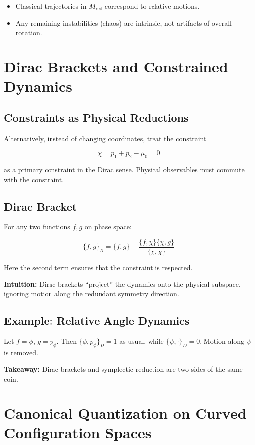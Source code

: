 \documentclass[11pt]{book}
\begin{document}
\begin{itemize}
    \item Classical trajectories in $M_{\text{red}}$ correspond to relative motions.
    \item Any remaining instabilities (chaos) are intrinsic, not artifacts of overall rotation.
\end{itemize}


\chapter{Dirac Brackets and Constrained Dynamics}

\section{Constraints as Physical Reductions}

Alternatively, instead of changing coordinates, treat the constraint

\[
\chi = p_1+p_2-\mu_0=0
\]

as a primary constraint in the Dirac sense. Physical observables must commute with the constraint.

\section{Dirac Bracket}

For any two functions $f,g$ on phase space:

\[
\{f,g\}_D = \{f,g\} - \frac{\{f,\chi\}\{\chi,g\}}{\{\chi,\chi\}}
\]

Here the second term ensures that the constraint is respected.  

\textbf{Intuition:} Dirac brackets “project” the dynamics onto the physical subspace, ignoring motion along the redundant symmetry direction.

\section{Example: Relative Angle Dynamics}

Let $f=\phi$, $g=p_\phi$. Then $\{\phi,p_\phi\}_D = 1$ as usual, while $\{\psi,\cdot\}_D = 0$. Motion along $\psi$ is removed.

\textbf{Takeaway:} Dirac brackets and symplectic reduction are two sides of the same coin.


\chapter{Canonical Quantization on Curved Configuration Spaces}
\end{document}
